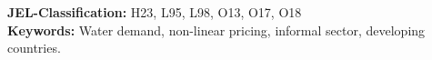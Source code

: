 \documentclass[12pt]{article}
\begin{document}
\begin{abstract}
	
















	


\end{abstract} 
\vspace{1cm}
{\bf JEL-Classification:} H23, L95, L98, O13, O17, O18 \\
\vspace{.1cm}
{\bf Keywords:} Water demand, non-linear pricing, informal sector, developing countries. 
\end{document}
